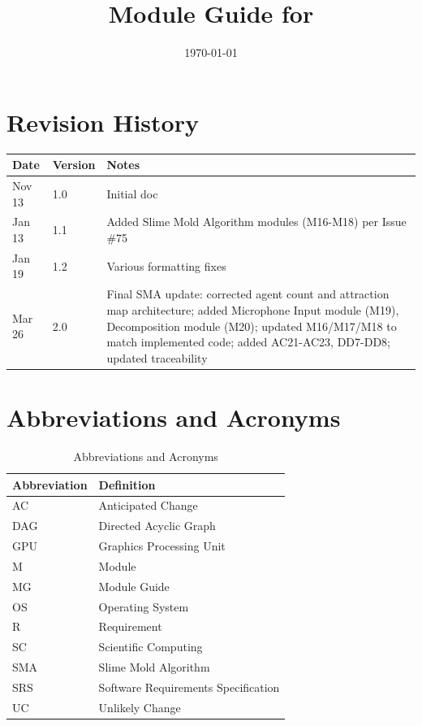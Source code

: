 \documentclass[12pt, titlepage]{article}
\begin{document}
\title{Module Guide for \progname{}} 
\author{\authname}
\date{\today}

\maketitle


\newpage

\tableofcontents

\listoftables

\newpage

\section{Revision History}

\begin{tabularx}{\textwidth}{p{3cm}p{2cm}X}
\toprule {\bf Date} & {\bf Version} & {\bf Notes}\\
\midrule
Nov 13 & 1.0 & Initial doc\\
Jan 13 & 1.1 & Added Slime Mold Algorithm modules (M16-M18) per Issue \#75\\
Jan 19 & 1.2 & Various formatting fixes\\
Mar 26 & 2.0 & Final SMA update: corrected agent count and attraction map architecture; added Microphone Input module (M19), Decomposition module (M20); updated M16/M17/M18 to match implemented code; added AC21-AC23, DD7-DD8; updated traceability\\
\bottomrule
\end{tabularx}

\newpage

\section{Abbreviations and Acronyms}

\begin{table}[H]
\centering
\begin{tabular}{|l|l|}
\hline
\textbf{Abbreviation} & \textbf{Definition} \\
\hline
AC & Anticipated Change \\
\hline
DAG & Directed Acyclic Graph \\
\hline
GPU & Graphics Processing Unit \\
\hline
M & Module \\
\hline
MG & Module Guide \\
\hline
OS & Operating System \\
\hline
R & Requirement \\
\hline
SC & Scientific Computing \\
\hline
SMA & Slime Mold Algorithm \\
\hline
SRS & Software Requirements Specification \\
\hline
UC & Unlikely Change \\
\hline
\end{tabular}
\caption{Abbreviations and Acronyms}
\end{table}
\end{document}
